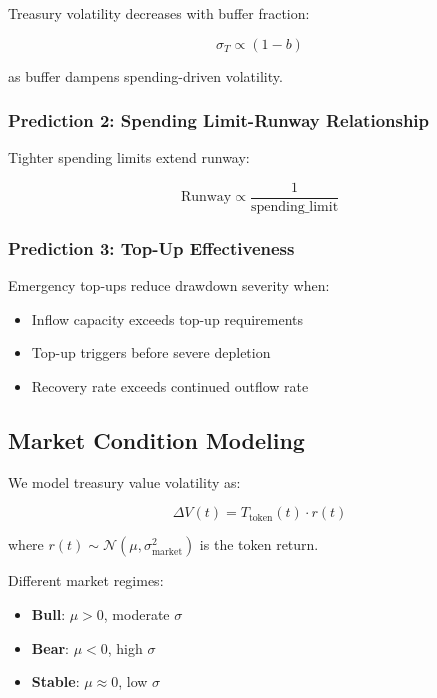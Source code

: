 Treasury volatility decreases with buffer fraction:

\begin{equation}
\sigma_T \propto (1 - b)
\end{equation}

as buffer dampens spending-driven volatility.

\subsubsection{Prediction 2: Spending Limit-Runway Relationship}

Tighter spending limits extend runway:

\begin{equation}
\text{Runway} \propto \frac{1}{\text{spending\_limit}}
\end{equation}

\subsubsection{Prediction 3: Top-Up Effectiveness}

Emergency top-ups reduce drawdown severity when:
\begin{itemize}
    \item Inflow capacity exceeds top-up requirements
    \item Top-up triggers before severe depletion
    \item Recovery rate exceeds continued outflow rate
\end{itemize}

\subsection{Market Condition Modeling}

We model treasury value volatility as:

\begin{equation}
\Delta V(t) = T_{\text{token}}(t) \cdot r(t)
\end{equation}

where $r(t) \sim \mathcal{N}(\mu, \sigma_{\text{market}}^2)$ is the token return.

Different market regimes:
\begin{itemize}
    \item \textbf{Bull}: $\mu > 0$, moderate $\sigma$
    \item \textbf{Bear}: $\mu < 0$, high $\sigma$
    \item \textbf{Stable}: $\mu \approx 0$, low $\sigma$
\end{itemize}
